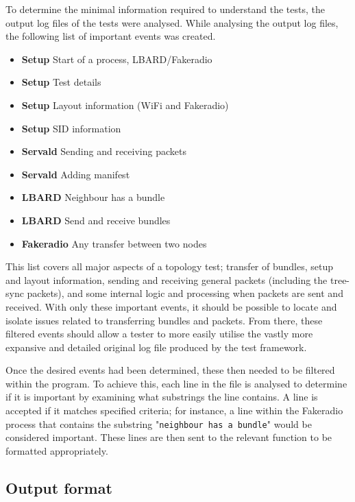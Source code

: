 To determine the minimal information required to understand the tests, the output log files of the tests were analysed.
While analysing the output log files, the following list of important events was created.
\begin{itemize}
    \item \textbf{Setup} Start of a process, LBARD/Fakeradio
    \item \textbf{Setup} Test details
    \item \textbf{Setup} Layout information (WiFi and Fakeradio)
    \item \textbf{Setup} SID information
    \item \textbf{Servald} Sending and receiving packets
    \item \textbf{Servald} Adding manifest
    \item \textbf{LBARD} Neighbour has a bundle
    \item \textbf{LBARD} Send and receive bundles
    \item \textbf{Fakeradio} Any transfer between two nodes
\end{itemize}

This list covers all major aspects of a topology test; transfer of bundles, setup and layout information, sending and receiving general packets (including the tree-sync packets), and some internal logic and processing when packets are sent and received.
With only these important events, it should be possible to locate and isolate issues related to transferring bundles and packets. 
From there, these filtered events should allow a tester to more easily utilise the vastly more expansive and detailed original log file produced by the test framework. 

Once the desired events had been determined, these then needed to be filtered within the program.
To achieve this, each line in the file is analysed to determine if it is important by examining what substrings the line contains.
A line is accepted if it matches specified criteria; for instance, a line within the Fakeradio process that contains the substring "\texttt{neighbour has a bundle}" would be considered important. 
These lines are then sent to the relevant function to be formatted appropriately.

\subsection{Output format}


